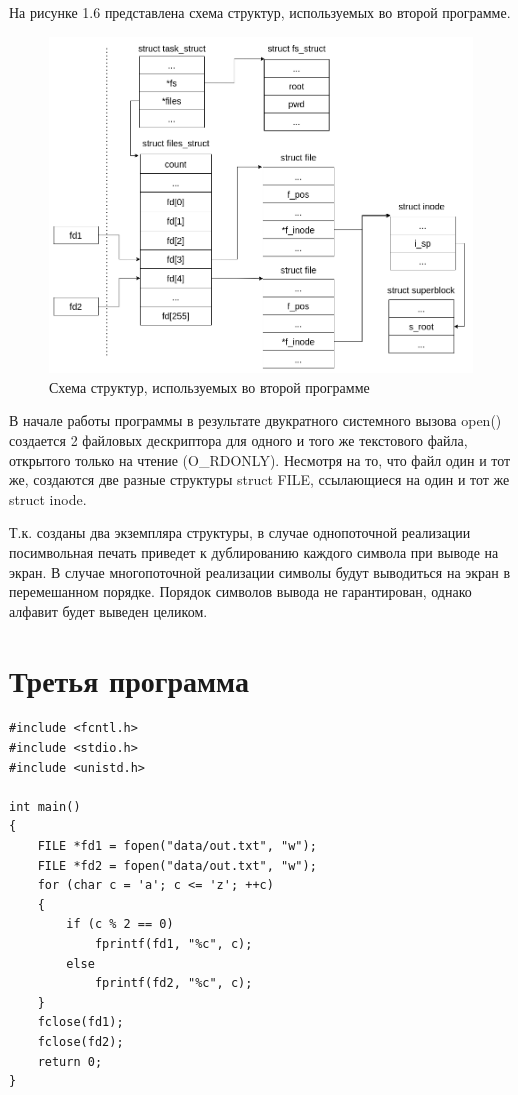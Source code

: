 \documentclass[12pt,a4paper]{scrreprt}
\begin{document}
На рисунке 1.6 представлена схема структур, используемых во второй программе.

\begin{figure}[H]
	\centering
	\includegraphics[scale=0.45]{pics/d2.png}
	\caption{Схема структур, используемых во второй программе}
\end{figure}

В начале работы программы в результате двукратного системного вызова open() создается 2 файловых дескриптора для одного и того же текстового файла, открытого только на чтение (O\_RDONLY). Несмотря на то, что файл один и тот же, создаются две разные структуры struct FILE, ссылающиеся на один и тот же struct inode. 

Т.к. созданы два экземпляра структуры, в случае однопоточной реализации посимвольная печать приведет к дублированию каждого символа при выводе на экран. В случае многопоточной реализации символы будут выводиться на экран в перемешанном порядке. Порядок символов вывода не гарантирован, однако алфавит будет выведен целиком.

\section{Третья программа}

\begin{lstlisting}[caption=Программа №3 (один поток)]
#include <fcntl.h>
#include <stdio.h>
#include <unistd.h>

int main()
{
	FILE *fd1 = fopen("data/out.txt", "w");
	FILE *fd2 = fopen("data/out.txt", "w");
	for (char c = 'a'; c <= 'z'; ++c)
	{
		if (c % 2 == 0)
			fprintf(fd1, "%c", c);
		else
			fprintf(fd2, "%c", c);
	}
	fclose(fd1);
	fclose(fd2);
	return 0;
}
\end{lstlisting}
\end{document}
